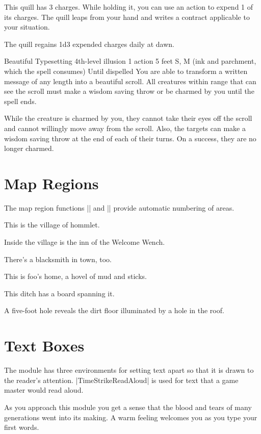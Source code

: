 \documentclass[../main.tex]{subfiles}
\begin{document}
This quill has 3 charges. While holding it, you can use an action to expend 1 of its charges. The quill leaps from your hand and writes a contract applicable to your situation.

The quill regains 1d3 expended charges daily at dawn.

\TimeStrikeSpellHeader%
  {Beautiful Typesetting}
  {4th-level illusion}
  {1 action}
  {5 feet}
  {S, M (ink and parchment, which the spell consumes)}
  {Until dispelled}
You are able to transform a written message of any length into a beautiful scroll. All creatures within range that can see the scroll must make a wisdom saving throw or be charmed by you until the spell ends.

While the creature is charmed by you, they cannot take their eyes off the scroll and cannot willingly move away from the scroll. Also, the targets can make a wisdom saving throw at the end of each of their turns. On a success, they are no longer charmed.

\section{Map Regions}
The map region functions |\TimeStrikeArea| and |\TimeStrikeSubArea| provide automatic numbering of areas.

This is the village of hommlet.

Inside the village is the inn of the Welcome Wench.

There's a blacksmith in town, too.

This is foo's home, a hovel of mud and sticks.

This ditch has a board spanning it.

A five-foot hole reveals the dirt floor illuminated by a hole in the roof.

\section{Text Boxes}

The module has three environments for setting text apart so that it is drawn to the reader's attention. |TimeStrikeReadAloud| is used for text that a game master would read aloud.

\begin{TimeStrikeReadAloud}
  As you approach this module you get a sense that the blood and tears of many generations went into its making. A warm feeling welcomes you as you type your first words.
\end{TimeStrikeReadAloud}
\end{document}

